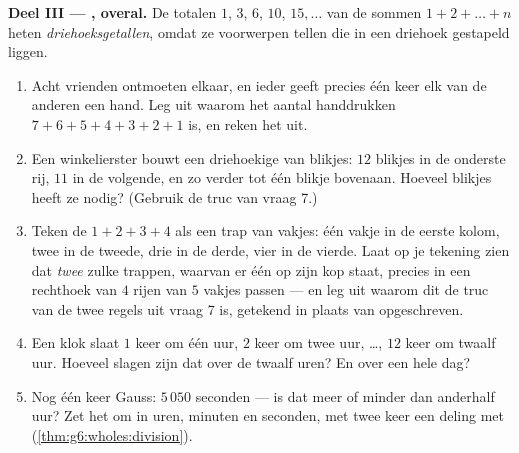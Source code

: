 \begin{problem}
\medskip
\noindent\textbf{Deel III --- , overal.}
De totalen $1$, $3$, $6$, $10$, $15, \dots$ van de sommen
$1 + 2 + \dots + n$ heten \emph{driehoeksgetallen},
omdat ze voorwerpen tellen die in een driehoek gestapeld liggen.
\begin{enumerate}[resume]
  \item Acht vrienden ontmoeten elkaar, en ieder geeft precies één keer elk
        van de anderen een hand. Leg uit waarom het aantal handdrukken
        $7 + 6 + 5 + 4 + 3 + 2 + 1$ is, en reken het uit.
  \item Een winkelierster bouwt een driehoekige  van blikjes: $12$
        blikjes in de onderste rij, $11$ in de volgende, en zo verder tot één
        blikje bovenaan. Hoeveel blikjes heeft ze nodig? (Gebruik de truc van
        vraag 7.)
  \item Teken de  $1 + 2 + 3 + 4$ als een trap van vakjes: één vakje in de
        eerste kolom, twee in de tweede, drie in de derde, vier in de vierde.
        Laat op je tekening zien dat \emph{twee} zulke trappen, waarvan er
        één op zijn kop staat, precies in een rechthoek van $4$ rijen van $5$
        vakjes passen --- en leg uit waarom dit de truc van de twee regels
        uit vraag 7 is, getekend in plaats van opgeschreven.
  \item Een klok slaat $1$ keer om één uur, $2$ keer om twee uur, \dots, $12$
        keer om twaalf uur. Hoeveel slagen zijn dat over de twaalf uren? En
        over een hele dag?
  \item Nog één keer Gauss: $5\,050$ seconden --- is dat meer of minder dan
        anderhalf uur? Zet het om in uren, minuten en seconden, met twee keer
        een deling met  (\cref{thm:g6:wholes:division}).
\end{enumerate}
\end{problem}
